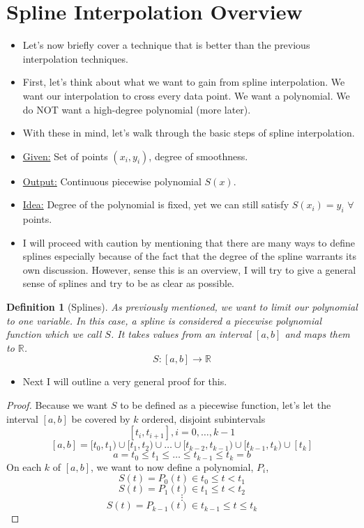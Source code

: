 \documentclass{article}
\newtheorem{definition}{Definition}
\begin{document}
\section{Spline Interpolation \text{|} Overview}
\begin{itemize}
\item Let's now briefly cover a technique that is better than the previous interpolation techniques.
\item First, let's think about what we want to gain from spline interpolation.
\subitem We want our interpolation to cross every data point.
\subitem We want a polynomial.
\subitem We do NOT want a high-degree polynomial (more later).
\item With these in mind, let's walk through the basic steps of spline interpolation.
\item \underline{Given:} Set of points $(x_i,y_i)$, degree of smoothness.
\item \underline{Output:} Continuous piecewise polynomial $S(x)$.
\item \underline{Idea:} Degree of the polynomial is fixed, yet we can still satisfy $S(x_i) = y_i$ $\forall$ points.
\item I will proceed with caution by mentioning that there are many ways to define splines especially because of the fact that the degree of the spline warrants its own discussion. However, sense this is an overview, I will try to give a general sense of splines and try to be as clear as possible.
\end{itemize}
\begin{definition}[Splines]
As previously mentioned, we want to limit our polynomial to one variable. In this case, a spline is considered a piecewise polynomial function which we call $S$. It takes values from an interval $[a,b]$ and maps them to $\mathbb{R}$.
\[
S:[a,b] \rightarrow \mathbb{R}
\]
\end{definition}
\begin{itemize}
\item Next I will outline a very general proof for this.
\end{itemize}
\begin{proof}
Because we want $S$ to be defined as a piecewise function, let's let the interval $[a,b]$ be covered by $k$ ordered, disjoint subintervals
\[
[t_i,t_{i+1}], i=0,\dots,k-1
\]
\[
[a,b]=[t_0,t_1) \cup [t_1,t_2) \cup \dots \cup [t_{k-2},t_{k-1}) \cup [t_{k-1},t_k) \cup [t_k]
\]
\[
a = t_0 \leq t_1 \leq \dots \leq t_{k-1} \leq t_k = b
\]
On each $k$ of $[a,b]$, we want to now define a polynomial, $P_i$,
\[
S(t) = P_0(t) \in{t_0 \leq t < t_1}
\]
\[
S(t) = P_1(t) \in{t_1 \leq t < t_2}
\]
\[
\vdots
\]
\[
S(t) = P_{k-1}(t) \in{t_{k-1} \leq t \leq t_k}
\]
\end{proof}
\end{document}
